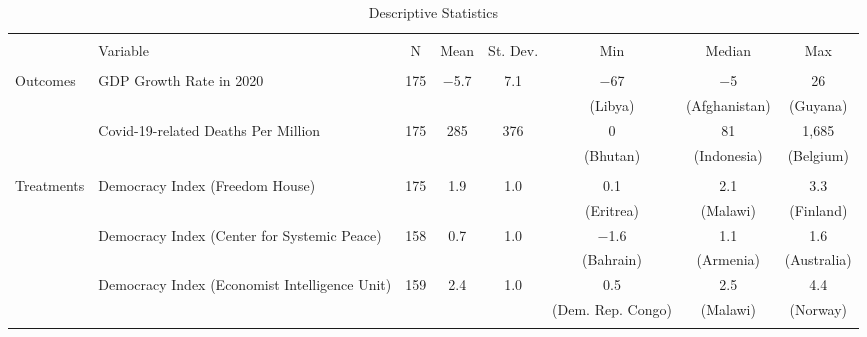 
\begin{table}[!htbp] \centering 
  \caption{Descriptive Statistics} 
  \label{tab:descriptive-stats} 
\scriptsize
\begin{threeparttable}
\begin{tabular}{@{\extracolsep{0pt}}llcccccc} 
\\[-1.8ex]\hline 
\hline \\[-1.8ex] 
& Variable & \multicolumn{1}{c}{N} & \multicolumn{1}{c}{Mean} & \multicolumn{1}{c}{St. Dev.} & \multicolumn{1}{c}{Min} & \multicolumn{1}{c}{Median} & \multicolumn{1}{c}{Max} \\ 
\hline \\[-1.8ex] 
Outcomes
& GDP Growth Rate in 2020 & 175 & $-$5.7 & 7.1 & $-$67 & $-$5 & 26 \\ 
& & & & & (Libya) & (Afghanistan) & (Guyana) \\
& Covid-19-related Deaths Per Million & 175 & 285 & 376 & 0 & 81 & 1,685 \\ 
& & & & & (Bhutan) & (Indonesia) & (Belgium) \\
 \hline \\[-1.8ex] 
 
Treatments
& Democracy Index (Freedom House) & 175 & 1.9 & 1.0 & 0.1 & 2.1 & 3.3 \\ 
& & & & & (Eritrea) & (Malawi) & (Finland) \\
& Democracy Index (Center for Systemic Peace) & 158 & 0.7 & 1.0 & $-$1.6 & 1.1 & 1.6 \\ 
& & & & & (Bahrain) & (Armenia) & (Australia) \\
& Democracy Index (Economist Intelligence Unit) & 159 & 2.4 & 1.0 & 0.5 & 2.5 & 4.4 \\ & & & & & (Dem. Rep. Congo) & (Malawi) & (Norway) \\
 
 \hline \\[-1.8ex] 
 

\end{tabular}
\end{threeparttable}
\end{table}

